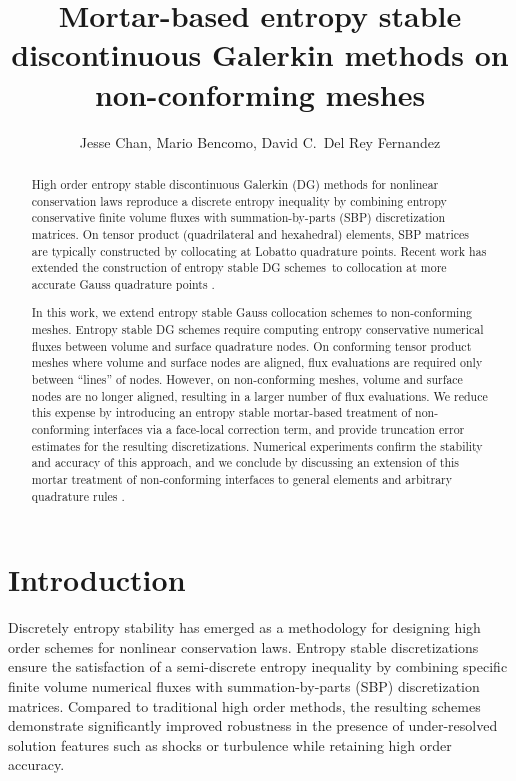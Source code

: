 \documentclass{svjour3}                     %
\date{}
\author{Jesse Chan, Mario Bencomo, David C.\ Del Rey Fernandez}
\title{Mortar-based entropy stable discontinuous Galerkin methods on non-conforming meshes}
\begin{document}
\maketitle

\begin{abstract}
High order entropy stable discontinuous Galerkin (DG) methods for nonlinear conservation laws reproduce a discrete entropy inequality by combining entropy conservative finite volume fluxes with summation-by-parts (SBP) discretization matrices.  On tensor product (quadrilateral and hexahedral) elements, SBP matrices are typically constructed by collocating at Lobatto quadrature points.  Recent work has extended the construction of entropy stable DG schemes to collocation at more accurate Gauss quadrature points \cite{chan2018efficient}.  

In this work, we extend entropy stable Gauss collocation schemes to non-conforming meshes.  Entropy stable DG schemes require computing entropy conservative numerical fluxes between volume and surface quadrature nodes.  On conforming tensor product meshes where volume and surface nodes are aligned, flux evaluations are required only between ``lines'' of nodes.  However, on non-conforming meshes, volume and surface nodes are no longer aligned, resulting in a larger number of flux evaluations.  We reduce this expense by introducing an entropy stable mortar-based treatment of non-conforming interfaces via a face-local correction term, and provide truncation error estimates for the resulting discretizations.  Numerical experiments confirm the stability and accuracy of this approach, and we conclude by discussing an extension of this mortar treatment of non-conforming interfaces to general elements and arbitrary quadrature rules \cite{chan2017discretely}.  
\end{abstract}



\section{Introduction}
Discretely entropy stability has emerged as a methodology for designing high order schemes for nonlinear conservation laws.  Entropy stable discretizations ensure the satisfaction of a semi-discrete entropy inequality by combining specific finite volume numerical fluxes with summation-by-parts (SBP) discretization matrices.  Compared to traditional high order methods, the resulting schemes demonstrate significantly improved robustness in the presence of under-resolved solution features such as shocks or turbulence while retaining high order accuracy.  
\end{document}
